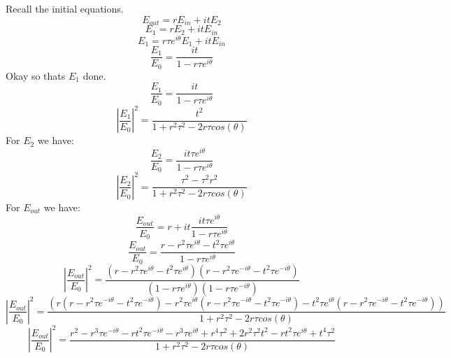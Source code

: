 Recall the initial equations.
\begin{equation}
E_{out}=rE_{in}+itE_2
\end{equation}
\begin{equation}
E_{1}=rE_2+itE_{in}
\end{equation}
\begin{equation}
E_{1}=r\tau e^{i\theta}E_1+itE_{in}
\end{equation}
%
\begin{equation}
\frac{E_{1}}{E_{0}}=\frac{it}{1-r\tau e^{i\theta}}
\end{equation}
Okay so thats $E_1$ done.
\begin{equation}
\frac{E_{1}}{E_{0}}=\frac{it}{1-r\tau e^{i\theta}}
\end{equation}
\begin{equation}
\left|\frac{E_{1}}{E_{0}}\right |^2=\frac{t^2}{1+r^2\tau^2-2r\tau cos(\theta)}
\end{equation}
For $E_{2}$ we have:
\begin{equation}
\frac{E_{2}}{E_{0}}=\frac{it\tau e^{i\theta}}{1-r\tau e^{i\theta}}
\end{equation}
%
\begin{equation}
\left |\frac{E_{2}}{E_{0}}\right |^2=\frac{\tau^2-\tau^2r^2}{1+r^2\tau^2-2r\tau cos(\theta)}
\end{equation}
For $E_{out}$ we have:
\begin{equation}
\frac{E_{out}}{E_{0}}=r+it\frac{it\tau e^{i\theta}}{1-r\tau e^{i\theta}}
\end{equation}
\begin{equation}
\frac{E_{out}}{E_{0}}=\frac{r-r^2\tau e^{i\theta}-t^2\tau e^{i\theta}}{1-r\tau e^{i\theta}}
\end{equation}
\begin{equation}
\left |\frac{E_{out}}{E_{0}}\right|^2=\frac{(r-r^2\tau e^{i\theta}-t^2\tau e^{i\theta})(r-r^2\tau e^{-i\theta}-t^2\tau e^{-i\theta})}{(1-r\tau e^{i\theta})(1-r\tau e^{-i\theta})}
\end{equation}
\begin{equation}
\left |\frac{E_{out}}{E_{0}}\right|^2=\frac{(r(r-r^2\tau e^{-i\theta}-t^2\tau e^{-i\theta})-r^2\tau e^{i\theta}(r-r^2\tau e^{-i\theta}-t^2\tau e^{-i\theta})-t^2\tau e^{i\theta}(r-r^2\tau e^{-i\theta}-t^2\tau e^{-i\theta}))}{1+r^2\tau^2-2r\tau cos(\theta)}
\end{equation}
%
\begin{equation}
\left |\frac{E_{out}}{E_{0}}\right|^2=\frac{r^2-r^3\tau e^{-i\theta}-rt^2\tau e^{-i\theta}-r^3\tau e^{i\theta}+r^4\tau^2+2r^2\tau^2t^2-rt^2\tau e^{i\theta}+t^4\tau^2}{1+r^2\tau^2-2r\tau cos(\theta)}
\end{equation}
